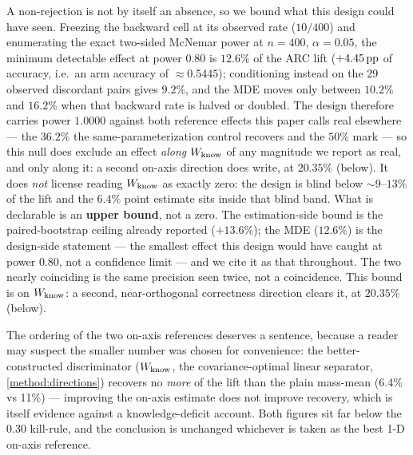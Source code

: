 A non-rejection is not by itself an absence, so we bound what this design could
have seen. Freezing the backward cell at its observed rate ($10/400$) and
enumerating the exact two-sided McNemar power at $n{=}400$, $\alpha=0.05$, the
minimum detectable effect at power $0.80$ is $\mathbf{12.6\%}$ of the ARC lift
($+4.45\,\mathrm{pp}$ of accuracy, i.e.\ an arm accuracy of ${\approx}0.5445$); conditioning
instead on the 29 observed discordant pairs gives $9.2\%$, and the MDE moves only
between $10.2\%$ and $16.2\%$ when that backward rate is halved or doubled. The
design therefore carries power $\mathbf{1.0000}$ against both reference effects
this paper calls real elsewhere --- the $36.2\%$ the same-parameterization control
recovers and the $50\%$ mark --- so this null does exclude an effect \emph{along
$W_{\mathrm{know}}$} of any magnitude we report as real, and only along it: a second on-axis
direction does write, at $20.35\%$ (below). It does \emph{not} license reading $W_{\mathrm{know}}$ as
exactly zero: the design is blind below ${\sim}9$--$13\%$ of the lift and the
$6.4\%$ point estimate sits inside that blind band. What is declarable is an
\textbf{upper bound}, not a zero. The estimation-side bound is the paired-bootstrap
ceiling already reported ($+13.6\%$); the MDE ($12.6\%$) is the design-side
statement --- the smallest effect this design would have caught at power $0.80$, not
a confidence limit --- and we cite it as that throughout. The two nearly coinciding
is the same precision seen twice, not a coincidence. This bound is on $W_{\mathrm{know}}$: a second, near-orthogonal
correctness direction clears it, at $20.35\%$ (below).

The ordering of the two on-axis references deserves a sentence, because a reader
may suspect the smaller number was chosen for convenience: the better-constructed
discriminator ($W_{\mathrm{know}}$, the covariance-optimal linear separator,
\cref{method:directions}) recovers no \emph{more} of the lift than the plain
mass-mean (6.4\% vs 11\%) --- improving the on-axis estimate does not improve
recovery, which is itself evidence against a knowledge-deficit account. Both
figures sit far below the 0.30 kill-rule, and the conclusion is unchanged whichever
is taken as the best 1-D on-axis reference.

